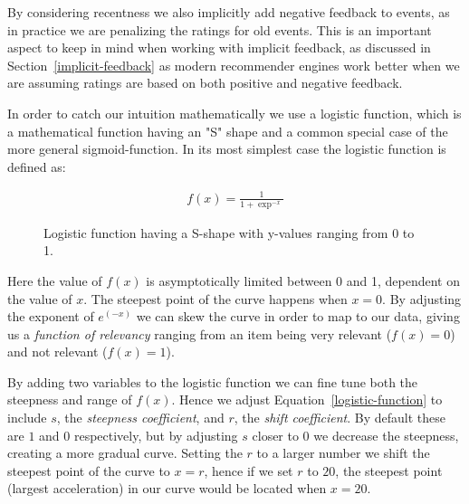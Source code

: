 By considering recentness we also implicitly add negative feedback to events,
as in practice we are penalizing the ratings for old events. This is an
important aspect to keep in mind when working with implicit feedback, as
discussed in Section~\ref{implicit-feedback} as modern recommender engines work
better when we are assuming ratings are based on both positive and negative
feedback.

In order to catch our intuition mathematically we use a logistic function, which
is a mathematical function having an "S" shape and a common special case of the
more general sigmoid-function. In its most simplest case the logistic function
is defined as:

\begin{figure}[H]
  \centering
  \noindent\begin{minipage}{.45\textwidth}
  \end{minipage}
  \begin{minipage}{.45\textwidth}
  \begin{align}
    \label{logistic-function}
    f(x) = \frac{1}{1+\exp^{-x}}
  \end{align}
  \end{minipage}
  \caption{Logistic function having a S-shape with y-values ranging
  from 0 to 1.}
\end{figure}

Here the value of $f(x)$ is asymptotically limited between 0 and 1, dependent
on the value of $x$. The steepest point of the curve happens when $x=0$. By
adjusting the exponent of $e^{(-x)}$ we can skew the curve in order to map to our
data, giving us a \textit{function of relevancy} ranging from an item being
very relevant ($f(x)=0$) and not relevant ($f(x)=1$).

By adding two variables to the logistic function we can fine tune both the
steepness and range of $f(x)$. Hence we adjust Equation~\ref{logistic-function}
to include $s$, the \textit{steepness coefficient}, and $r$, the \textit{shift
coefficient}. By default these are $1$ and $0$ respectively, but by adjusting
$s$ closer to 0 we decrease the steepness, creating a more gradual curve.
Setting the $r$ to a larger number we shift the steepest point of the curve to
$x=r$, hence if we set $r$ to $20$, the steepest point (largest acceleration)
in our curve would be located when $x=20$.

